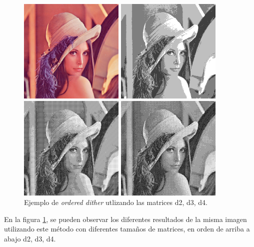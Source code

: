 \documentclass[conference]{IEEEtran}
\begin{document}
\begin{figure}[htbp]
\centerline{\includegraphics[height=50mm]{code/lena}}
\centerline{\includegraphics[height=50mm]{code/ordered_dither_2_lena}}
\centerline{\includegraphics[height=50mm]{code/ordered_dither_3_lena}}
\centerline{\includegraphics[height=50mm]{code/ordered_dither_4_lena}}
\caption{Ejemplo de \textit{ordered dither} utlizando las matrices d2, d3, d4.}
\label{ordered}
\end{figure}

En la figura \ref{ordered}, se pueden observar los diferentes resultados de la misma imagen utilizando este método con diferentes tamaños de matrices, en orden de arriba a abajo d2, d3, d4.
\end{document}
